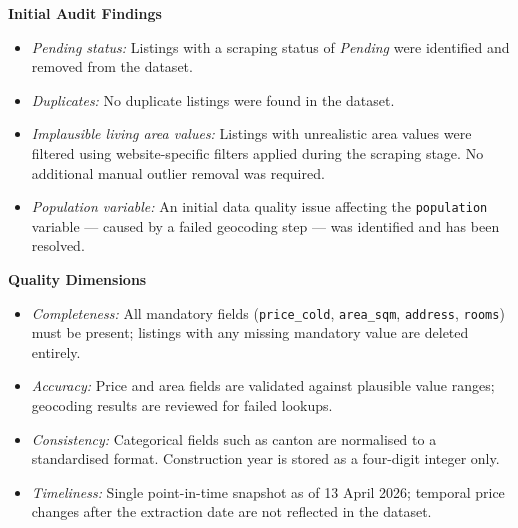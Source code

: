 \documentclass[11pt, a4paper]{article}
\begin{document}
\vspace{0.5em}
\textbf{Initial Audit Findings}

\begin{itemize}
    \item \textit{Pending status:} Listings with a scraping status of \textit{Pending} were identified and removed from the dataset.
    \item \textit{Duplicates:} No duplicate listings were found in the dataset.
    \item \textit{Implausible living area values:} Listings with unrealistic area values were filtered using website-specific filters applied during the scraping stage. No additional manual outlier removal was required.
    \item \textit{Population variable:} An initial data quality issue affecting the \texttt{population} variable --- caused by a failed geocoding step --- was identified and has been resolved.
\end{itemize}

\vspace{0.5em}
\textbf{Quality Dimensions}

\begin{itemize}
    \item \textit{Completeness:} All mandatory fields (\texttt{price\_cold}, \texttt{area\_sqm}, \texttt{address}, \texttt{rooms}) must be present; listings with any missing mandatory value are deleted entirely.
    \item \textit{Accuracy:} Price and area fields are validated against plausible value ranges; geocoding results are reviewed for failed lookups.
    \item \textit{Consistency:} Categorical fields such as canton are normalised to a standardised format. Construction year is stored as a four-digit integer only.
    \item \textit{Timeliness:} Single point-in-time snapshot as of 13 April 2026; temporal price changes after the extraction date are not reflected in the dataset.
\end{itemize}

\end{document}
